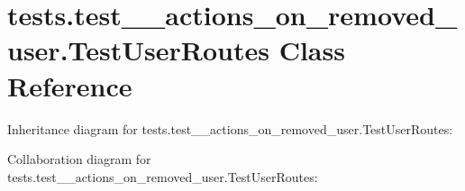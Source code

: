 \hypertarget{classtests_1_1test__12__actions__on__removed__user_1_1_test_user_routes}{}\section{tests.\+test\+\_\+\_\+actions\+\_\+on\+\_\+removed\+\_\+user.\+Test\+User\+Routes Class Reference}
\label{classtests_1_1test__12__actions__on__removed__user_1_1_test_user_routes}


Inheritance diagram for tests.\+test\+\_\+\_\+actions\+\_\+on\+\_\+removed\+\_\+user.\+Test\+User\+Routes\+:


Collaboration diagram for tests.\+test\+\_\+\_\+actions\+\_\+on\+\_\+removed\+\_\+user.\+Test\+User\+Routes\+:
